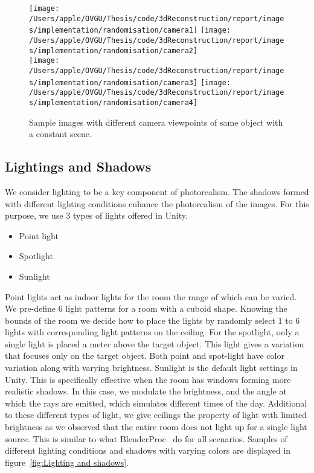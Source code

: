 \begin{figure}
    \centering
    \texttt{[image: /Users/apple/OVGU/Thesis/code/3dReconstruction/report/images/implementation/randomisation/camera1]}
    \texttt{[image: /Users/apple/OVGU/Thesis/code/3dReconstruction/report/images/implementation/randomisation/camera2]}\\
    \vspace{0.1cm}
    \texttt{[image: /Users/apple/OVGU/Thesis/code/3dReconstruction/report/images/implementation/randomisation/camera3]}
    \texttt{[image: /Users/apple/OVGU/Thesis/code/3dReconstruction/report/images/implementation/randomisation/camera4]}\\
    \caption{Sample images with different camera viewpoints of same object with a constant scene.}
    \label{fig:Camera viewpoints}
\end{figure}

\subsection{Lightings and Shadows}\label{subsec:lightings-and-shadows}

We consider lighting to be a key component of photorealism.
The shadows formed with different lighting conditions enhance the photorealism of the images.
For this purpose, we use 3 types of lights offered in Unity.

\begin{itemize}
    \item Point light
    \item Spotlight
    \item Sunlight
\end{itemize}

Point lights act as indoor lights for the room the range of which can be varied.
We pre-define 6 light patterns for a room with a cuboid shape.
Knowing the bounds of the room we decide how to place the lights by randomly select 1 to 6 lights with corresponding light patterns on the ceiling.
For the spotlight, only a single light is placed a meter above the target object.
This light gives a variation that focuses only on the target object.
Both point and spot-light have color variation along with varying brightness.
Sunlight is the default light settings in Unity.
This is specifically effective when the room has windows forming more realistic shadows.
In this case, we modulate the brightness, and the angle at which the rays are emitted, which simulates different times of the day.
Additional to these different types of light, we give ceilings the property of light with limited brightness as we observed that the entire room does not light up for a single light source.
This is similar to what BlenderProc~\cite{denninger2019blenderproc} do for all scenarios.
Samples of different lighting conditions and shadows with varying colors are displayed in figure~\ref{fig:Lighting and shadows}.

